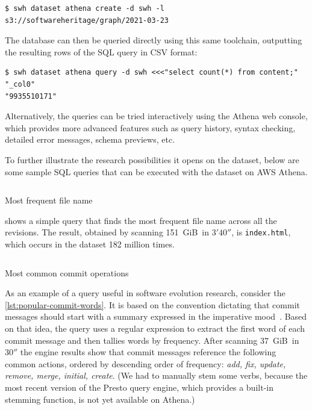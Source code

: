 \begin{verbatim}
$ swh dataset athena create -d swh -l s3://softwareheritage/graph/2021-03-23
\end{verbatim}

The database can then be queried directly using this same toolchain, outputting
the resulting rows of the SQL query in CSV format:

\begin{verbatim}
$ swh dataset athena query -d swh <<<"select count(*) from content;"
"_col0"
"9935510171"
\end{verbatim}

Alternatively, the queries can be tried interactively using the Athena web
console, which provides more advanced features such as query history, syntax
checking, detailed error messages, schema previews, etc.

To further illustrate the research possibilities it opens on the dataset, below
are some sample SQL queries that can be executed with the dataset on
\textsc{AWS} Athena.

\begin{listing}
    \inputminted[firstline=4]{sql}{codesamples/graph-dataset/popular-file.sql}
    \caption{Most frequent file name}%
    \label{lst:popular-file}
\end{listing}

 shows a simple query
that finds the most frequent file name across all the revisions.
The result, obtained by scanning
151~GiB\ in $3'40''$, is \texttt{index.html}, which occurs in the dataset 182
million times.

\begin{listing}
    \inputminted[firstline=3]{sql}{codesamples/graph-dataset/popular-commit-words.sql}
    \caption{Most common commit operations}%
    \label{lst:popular-commit-words}
\end{listing}

As an example of a query useful in software evolution research,
consider the \cref{lst:popular-commit-words}.
It is based on the convention dictating that commit messages should
start with a summary expressed in the imperative mood~\cite[3.3.2.1]{Fre19}.
Based on that idea, the query uses a regular expression to extract the first
word of each commit message and then tallies words by frequency.
After scanning 37~GiB\ in $30''$ the engine results show that commit messages
reference the following common actions, ordered by descending order of
frequency:
\emph{add, fix, update, remove, merge, initial, create}.
(We had to manually stem some verbs,
because the most recent version of the Presto query engine,
which provides a built-in stemming function,
is not yet available on Athena.)


